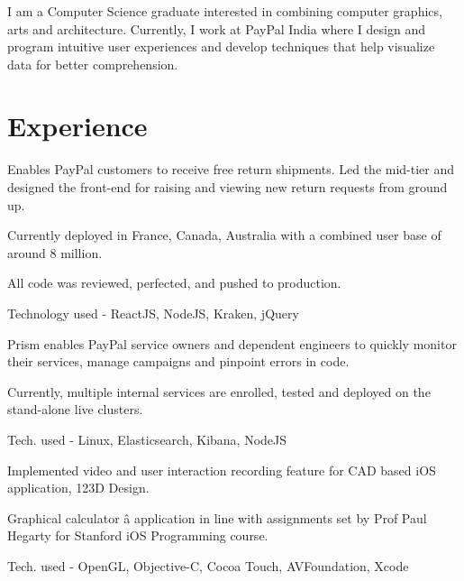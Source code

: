 \documentclass[]{deedy-resume-openfont}
\begin{document}
\hfill
\begin{minipage}[t]{0.66\textwidth} 

\subsubsection*{}
I am a Computer Science graduate interested in combining computer graphics, arts and architecture. Currently, I work at PayPal India where I design and program intuitive user experiences and develop techniques that help visualize data for better comprehension.
\section{Experience}

\vspace{\topsep}
 Enables PayPal customers to receive free return shipments. Led the mid-tier and designed the front-end for raising and viewing new return requests from ground up.
\begin{tightemize}
\vspace{\topsep}
\item Currently deployed in France, Canada, Australia with a combined user base of around 8 million.
\item All code was reviewed, perfected, and pushed to production.
\item Technology used - ReactJS, NodeJS, Kraken, jQuery
\end{tightemize}
\vspace{\topsep}

 Prism enables PayPal service owners and dependent engineers to quickly monitor their services, manage campaigns and pinpoint errors in code.
\begin{tightemize}
\item Currently, multiple internal services are enrolled, tested and deployed on the stand-alone live clusters.
\item Tech. used - Linux, Elasticsearch, Kibana, NodeJS
\end{tightemize}

\sectionsep
\vspace{\topsep}

\begin{tightemize}
\item Implemented video and user interaction recording feature for CAD based iOS application, 123D Design.
\item Graphical calculator â application in line with assignments set by Prof Paul Hegarty for Stanford iOS Programming course.
\item Tech. used - OpenGL, Objective-C, Cocoa Touch, AVFoundation, Xcode
\end{tightemize}
\sectionsep


\end{minipage}
\end{document}
